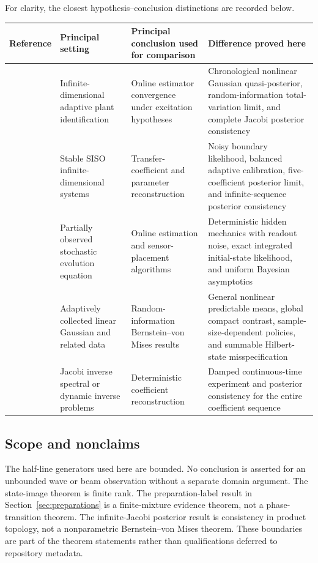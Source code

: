 For clarity, the closest hypothesis--conclusion distinctions are recorded below.
\begin{center}
\small
\begin{tabularx}{\textwidth}{>{\raggedright\arraybackslash}p{}
>{\raggedright\arraybackslash}p{}
>{\raggedright\arraybackslash}X
>{\raggedright\arraybackslash}X}
\toprule
Reference & Principal setting & Principal conclusion used for comparison & Difference proved here\\
\midrule
\cite{Baumeister1997,DemetriouRosen1994Inverse,DemetriouRosen1994PE}
& Infinite-dimensional adaptive plant identification
& Online estimator convergence under excitation hypotheses
& Chronological nonlinear Gaussian quasi-posterior, random-information total-variation limit, and complete Jacobi posterior consistency\\
\cite{Chattopadhyay2025}
& Stable SISO infinite-dimensional systems
& Transfer-coefficient and parameter reconstruction
& Noisy boundary likelihood, balanced adaptive calibration, five-coefficient posterior limit, and infinite-sequence posterior consistency\\
\cite{SharrockKantas2022}
& Partially observed stochastic evolution equation
& Online estimation and sensor-placement algorithms
& Deterministic hidden mechanics with readout noise, exact integrated initial-state likelihood, and uniform Bayesian asymptotics\\
\cite{DuNairJanson2025}
& Adaptively collected linear Gaussian and related data
& Random-information Bernstein--von Mises results
& General nonlinear predictable means, global compact contrast, sample-size-dependent policies, and summable Hilbert-state misspecification\\
\cite{GesztesySimon1997,Teschl2000,Mikhaylov2019}
& Jacobi inverse spectral or dynamic inverse problems
& Deterministic coefficient reconstruction
& Damped continuous-time experiment and posterior consistency for the entire coefficient sequence\\
\bottomrule
\end{tabularx}
\end{center}

\subsection{Scope and nonclaims}

The half-line generators used here are bounded.  No conclusion is asserted for an unbounded wave or beam observation without a separate domain argument.  The state-image theorem is finite rank.  The preparation-label result in Section~\ref{sec:preparations} is a finite-mixture evidence theorem, not a phase-transition theorem.  The infinite-Jacobi posterior result is consistency in product topology, not a nonparametric Bernstein--von Mises theorem.  These boundaries are part of the theorem statements rather than qualifications deferred to repository metadata.
